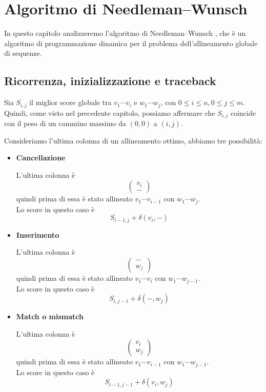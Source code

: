 \section{Algoritmo di Needleman--Wunsch}

In questo capitolo analizzeremo l'algoritmo di Needleman--Wunsch \cite{needleman--wunsch}, che è un algoritmo di programmazione dinamica per il problema
dell'allineamento globale di sequenze.

\subsection{Ricorrenza, inizializzazione e traceback}
\label{sec:NW-1}

Sia $S_{i,j}$ il miglior score globale tra $v_{1}\cdots v_{i}$ e $w_{1} \cdots w_{j}$, con $0 \leq i \leq n, 0 \leq j \leq m$.
Quindi, come visto nel precedente capitolo, possiamo affermare che $S_{i,j}$ coincide con il peso di un cammino massimo da $(0,0)$ a $(i,j)$.

Consideriamo l'ultima colonna di un allineamento ottimo, abbiamo tre possibilità:
\begin{itemize}
    \item \textbf{Cancellazione}

        L'ultima colonna è
        \[
            \begin{pmatrix}
                v_{i} \\ -
            \end{pmatrix}
        \]
        quindi prima di essa è stato allineato $v_{1}\cdots v_{i-1}$ con $w_{1}\cdots w_{j}$.\\
        Lo score in questo caso è 
        \[
            S_{i-1,j} + \delta(v_{i},-)
        \]
    \item \textbf{Inserimento}

        L'ultima colonna è
        \[
            \begin{pmatrix}
                - \\ w_{j}
            \end{pmatrix}
        \]
        quindi prima di essa è stato allineato $v_{1}\cdots v_{i}$ con $w_{1}\cdots w_{j-1}$.\\
        Lo score in questo caso è 
        \[
            S_{i,j-1} + \delta(-,w_{j})
        \]
    \item \textbf{Match o mismatch}

        L'ultima colonna è
        \[
            \begin{pmatrix}
                v_{i} \\ w_{j}
            \end{pmatrix}
        \]
        quindi prima di essa è stato allineato $v_{1}\cdots v_{i-1}$ con $w_{1}\cdots w_{j-1}$.\\
        Lo score in questo caso è
        \[
            S_{i-1,j-1} + \delta(v_{i},w_{j})
        \]       
\end{itemize}

